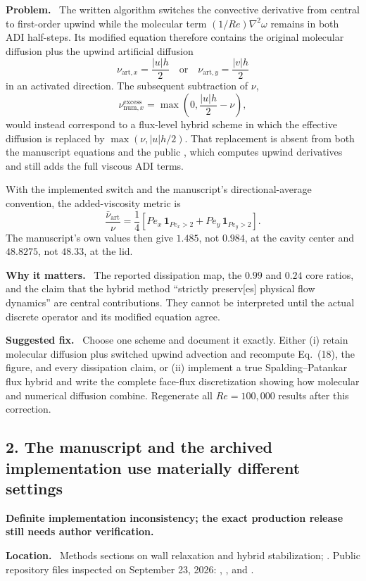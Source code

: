\documentclass[11pt,a4paper]{article}
\newcommand{\classify}[1]{\textcolor{blue!65!black}{\textbf{#1}}}
\newcommand{\field}[1]{\par\noindent\textbf{#1}\ }
\begin{document}
\field{Problem.} The written algorithm switches the convective derivative from central to first-order upwind while the molecular term $(1/Re)\nabla^2\omega$ remains in both ADI half-steps. Its modified equation therefore contains the original molecular diffusion plus the upwind artificial diffusion
\[
  \nu_{\mathrm{art},x}=\frac{|u|h}{2}
  \quad\text{or}\quad
  \nu_{\mathrm{art},y}=\frac{|v|h}{2}
\]
in an activated direction. The subsequent subtraction of $\nu$,
\[
  \nu_{\mathrm{num},x}^{\mathrm{excess}}
  =\max\!\left(0,\frac{|u|h}{2}-\nu\right),
\]
would instead correspond to a flux-level hybrid scheme in which the effective diffusion is replaced by $\max(\nu,|u|h/2)$. That replacement is absent from both the manuscript equations and the public , which computes upwind derivatives and still adds the full viscous ADI terms.

With the implemented switch and the manuscript's directional-average convention, the added-viscosity metric is
\[
  \frac{\bar\nu_{\mathrm{art}}}{\nu}
  =\frac14\left[
  Pe_x\,\mathbf{1}_{Pe_x>2}+Pe_y\,\mathbf{1}_{Pe_y>2}
  \right].
\]
The manuscript's own values then give $1.485$, not $0.984$, at the cavity center and $48.8275$, not $48.33$, at the lid.

\field{Why it matters.} The reported dissipation map, the $0.99$ and $0.24$ core ratios, and the claim that the hybrid method ``strictly preserv[es] physical flow dynamics'' are central contributions. They cannot be interpreted until the actual discrete operator and its modified equation agree.

\field{Suggested fix.} Choose one scheme and document it exactly. Either (i) retain molecular diffusion plus switched upwind advection and recompute Eq.~(18), the figure, and every dissipation claim, or (ii) implement a true Spalding--Patankar flux hybrid and write the complete face-flux discretization showing how molecular and numerical diffusion combine. Regenerate all $Re=100{,}000$ results after this correction.

\subsection*{2. The manuscript and the archived implementation use materially different settings}

\classify{Definite implementation inconsistency; the exact production release still needs author verification.}

\field{Location.} Methods sections on wall relaxation and hybrid stabilization; . Public repository files inspected on September 23, 2026: , , and .
\end{document}
